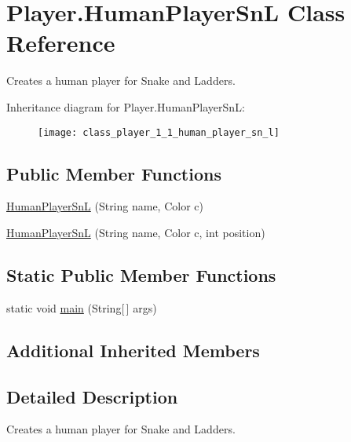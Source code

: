 \hypertarget{class_player_1_1_human_player_sn_l}{}\section{Player.\+Human\+Player\+Sn\+L Class Reference}
\label{class_player_1_1_human_player_sn_l}


Creates a human player for Snake and Ladders.  


Inheritance diagram for Player.\+Human\+Player\+Sn\+L\+:\begin{figure}[H]
\begin{center}
\leavevmode
\texttt{[image: class\_player\_1\_1\_human\_player\_sn\_l]}
\end{center}
\end{figure}
\subsection*{Public Member Functions}
\begin{DoxyCompactItemize}
\item 
\hyperlink{class_player_1_1_human_player_sn_l_a7605b134f337342fedb834ec55a03b7a}{Human\+Player\+Sn\+L} (String name, Color c)
\item 
\hyperlink{class_player_1_1_human_player_sn_l_ab22f9ceaee8c00bd22b6372d54452391}{Human\+Player\+Sn\+L} (String name, Color c, int position)
\end{DoxyCompactItemize}
\subsection*{Static Public Member Functions}
\begin{DoxyCompactItemize}
\item 
static void \hyperlink{class_player_1_1_human_player_sn_l_a74ccdaec9a1d4188bd8c6c79b2c7f712}{main} (String\mbox{[}$\,$\mbox{]} args)
\end{DoxyCompactItemize}
\subsection*{Additional Inherited Members}


\subsection{Detailed Description}
Creates a human player for Snake and Ladders. 

